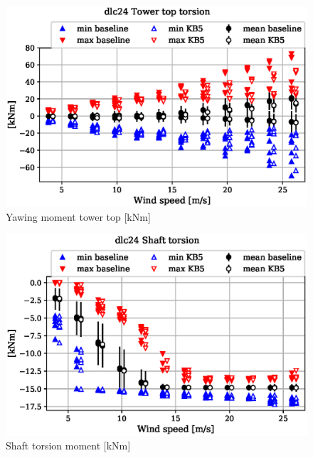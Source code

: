 \begin{figure}[!ht]
\begin{center}
	\includegraphics[width=.85\linewidth]{figures/baseline-vs-KB6/dlc24/tower-tower-node-004-momentvec-z_AA0008_AA0008.eps}
\end{center}
\caption{Yawing moment tower top [kNm]}
\label{fig:baseline-vs-KB6:dlc24:tower-top-yaw}
\end{figure}

\begin{figure}[!ht]
\begin{center}
	\includegraphics[width=.85\linewidth]{figures/baseline-vs-KB6/dlc24/shaft-shaft-node-001-momentvec-z_AA0008_AA0008.eps}
\end{center}
\caption{Shaft torsion moment [kNm]}
\label{fig:baseline-vs-KB6:dlc24:shaft-torsion}
\end{figure}

